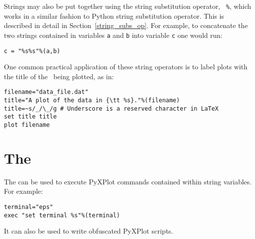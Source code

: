 Strings may also be put together using the string substitution operator, {\tt
\%}, which works in a similar fashion to
Python string substitution operator. This
is described in detail in Section~\ref{string_subs_op}.  For example, to
concatenate the two strings contained in variables {\tt a} and {\tt b} into
variable {\tt c} one would run:

\begin{verbatim}
c = "%s%s"%(a,b)
\end{verbatim}

One common practical application of these string operators is to label plots
with the title of the \datafile\ being plotted, as in:

\begin{verbatim}
filename="data_file.dat"
title="A plot of the data in {\tt %s}."%(filename)
title=~s/_/\_/g # Underscore is a reserved character in LaTeX
set title title
plot filename
\end{verbatim}

\section{The }

The  can be used to execute PyXPlot commands contained within
string variables. For example:

\begin{verbatim}
terminal="eps"
exec "set terminal %s"%(terminal)
\end{verbatim}

It can also be used to write obfuscated PyXPlot scripts.


